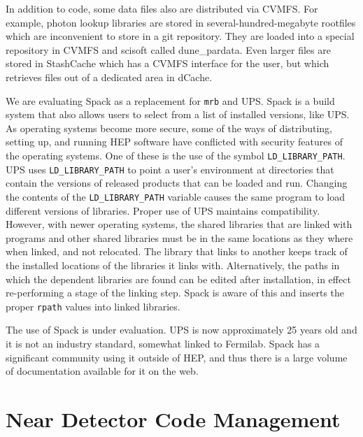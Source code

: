 \documentclass[../main-v1.tex]{subfiles}
\begin{document}
In addition to code, some data files also are distributed via CVMFS.  For example, photon lookup libraries are stored in several-hundred-megabyte rootfiles which are inconvenient to store in a git repository.  They are loaded into a special repository in CVMFS and scisoft called dune\_pardata.  Even larger files are stored in StashCache which has a CVMFS interface for the user, but which retrieves files out of a dedicated area in dCache.

We are evaluating Spack as a replacement for {\tt mrb} and UPS.  Spack is a build system that also allows users to select from a list of installed versions, like UPS.  As operating systems become more secure, some of the ways of distributing, setting up, and running HEP software have conflicted with security features of the operating systems.  One of these is the use of the symbol {\tt LD\_LIBRARY\_PATH}.  UPS uses {\tt LD\_LIBRARY\_PATH} to point a user's environment at directories that contain the versions of released products that can be loaded and run.  Changing the contents of the {\tt LD\_LIBRARY\_PATH} variable causes the same program to load different versions of libraries.  Proper use of UPS maintains compatibility.  However, with newer operating systems, the shared libraries that are linked with programs and other shared libraries must be in the same locations as they where when linked, and not relocated.  The library that links to another keeps track of the installed locations of the libraries it links with.  Alternatively, the paths in which the dependent libraries are found can be edited after installation, in effect re-performing a stage of the linking step.  Spack is aware of this and inserts the proper {\tt rpath} values into linked libraries.

The use of Spack is under evaluation.  UPS is now approximately 25 years old and it is not an industry standard, somewhat linked to Fermilab.  Spack has a significant community using it outside of HEP, and thus there is a large volume of documentation available for it on the web.

\section{Near Detector Code Management }
\label{sec:codemgmt:neardet}  %
\end{document}
